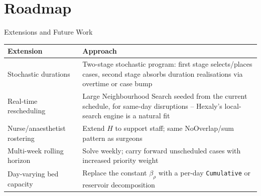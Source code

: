 \documentclass[aspectratio=169]{beamer}
\begin{document}
\section{Roadmap}

\begin{frame}{Extensions and Future Work}
  \footnotesize
  \begin{table}
    \centering
    \begin{tabular}{p{3.6cm}p{7.8cm}}
      \toprule
      Extension & Approach \\
      \midrule
      Stochastic durations & Two-stage stochastic program: first stage selects/places
        cases, second stage absorbs duration realisations via overtime or case bump \\
      Real-time rescheduling & Large Neighbourhood Search seeded from the current
        schedule, for same-day disruptions -- Hexaly's local-search engine is a
        natural fit \\
      Nurse/anaesthetist rostering & Extend $H$ to support staff; same NoOverlap/sum
        pattern as surgeons \\
      Multi-week rolling horizon & Solve weekly; carry forward unscheduled cases with
        increased priority weight \\
      Day-varying bed capacity & Replace the constant $\beta_\rho$ with a per-day
        \texttt{Cumulative} or reservoir decomposition \\
      \bottomrule
    \end{tabular}
  \end{table}
\end{frame}
\end{document}
